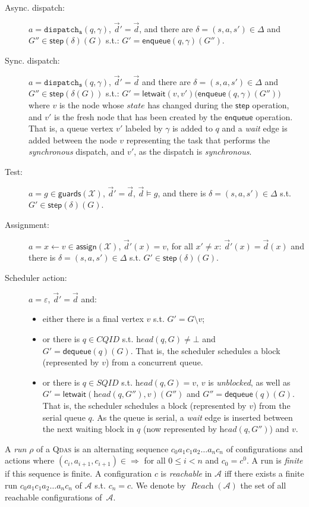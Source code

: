\documentclass[runningheads,oribibl,]{article}
\newcommand{\Aa}{\ensuremath{\mathcal{A}}\xspace}
\newcommand{\Xx}{\ensuremath{\mathcal{X}}\xspace}
\newcommand{\e}{\ensuremath{\varepsilon}\xspace}
\newcommand{\cfont}[1]{\ensuremath{\mathtt{#1}}\xspace}
\newcommand{\CQID}{CQID\xspace}
\newcommand{\SQID}{SQID\xspace}
\newcommand{\qdas}{\textsc{Qdas}\xspace}
\DeclareMathOperator{\Reach}{\textit{Reach}}
\newcommand{\Graph}{\ensuremath{G}}
\newcommand{\Data}{\ensuremath{\vec{d}}}
\newcommand{\state}{\ensuremath{\textit{state}}}
\newcommand{\head}{\ensuremath{\textit{head}}}
\newcommand{\enqueue}{\ensuremath{\textsf{enqueue}}}
\newcommand{\dequeue}{\ensuremath{\textsf{dequeue}}}
\newcommand{\step}{\ensuremath{\textsf{step}}}
\newcommand{\letwait}{\ensuremath{\textsf{letwait}}}
\newcommand{\disps}{\ensuremath{\cfont{dispatch_s}}}
\newcommand{\dispa}{\ensuremath{\cfont{dispatch_a}}}
\newcommand{\guardson}[1]{\ensuremath{\mathsf{guards}\left(#1\right)}}
\newcommand{\assignon}[1]{\ensuremath{\mathsf{assign}\left(#1\right)}}
\begin{document}
\begin{description}
\item[Async. dispatch:] $a=\dispa(q,\gamma)$, $\Data'=\Data$, and
  there are $\delta=(s,a,s')\in \Delta$ and
  $\Graph''\in\step(\delta)(\Graph)$ s.t.:
  $\Graph'=\enqueue(q,\gamma)(\Graph'')$.
\item[Sync. dispatch:] $a=\disps(q,\gamma)$, $\Data'=\Data$ and there
  are $\delta=(s,a,s')\in \Delta$ and
  $\Graph''\in\step(\delta(\Graph))$
  s.t.: $\Graph'=\letwait(v,v')\big(\enqueue(q,\gamma)(\Graph'')\big)$
  where $v$ is the node whose $\state$ has changed during the $\step$
  operation, and $v'$ is the fresh node that has been created by the
  $\enqueue$ operation. That is, a queue vertex $v'$ labeled by
  $\gamma$ is added to $q$ and a \emph{wait} edge is added between the
  node $v$ representing the task that performs the \emph{synchronous}
  dispatch, and $v'$, as the dispatch is \emph{synchronous}.
\item[Test:] $a=g\in\guardson{\Xx}$, $\Data'=\Data$, $\Data\models g$,
  and there is $\delta=(s,a,s')\in \Delta$ s.t.
  $\Graph'\in\step(\delta)(\Graph)$.
\item[Assignment:] $a=x\gets v\in\assignon{\Xx}$, $\Data'(x)=v$, for
  all $x'\neq x$: $\Data'(x)=\Data(x)$ and there is
  $\delta=(s,a,s')\in \Delta$
  s.t. $\Graph'\in\step(\delta)(\Graph)$.
\item[Scheduler action:] $a=\e$, $\Data'=\Data$ and:
  \begin{itemize}
  \item either there is a final vertex $v$
    s.t. $\Graph'=\Graph\setminus v$;
  \item or there is $q\in\CQID$ s.t. $\head(q,\Graph)\neq\bot$ and
    $\Graph'=\dequeue(q)(\Graph)$. That is, the scheduler schedules a
    block (represented by $v$) from a concurrent queue.
  \item or there is $q\in \SQID$ s.t.  $\head(q,\Graph)=v$, $v$ is
    \emph{unblocked}, as well as $\Graph'=\letwait(\head(q,G''),v)(G'')$ and
    $G''=\dequeue(q)(\Graph)$. That is, the scheduler schedules a
    block (represented by $v$) from the serial queue $q$. As the queue
    is serial, a \emph{wait} edge is inserted between the next waiting
    block in $q$ (now represented by $\head(q,G'')$) and $v$.
  \end{itemize}

 \end{description}


 A \emph{run} $\rho$ of a \qdas is an alternating sequence $c_0
 a_1 c_1 a_2\dots a_n c_n$ of configurations and actions where
 $(c_i,a_{i+1},c_{i+1})\in\Longrightarrow$ for all $0\leq i < n$ and
 $c_0=c^0$. A run is \emph{finite} if this sequence is
 finite.
 A configuration $c$ is \emph{reachable} in $\Aa$ iff there
 exists a finite run $c_0 a_1 c_1 a_2\dots a_n c_n$ of $\Aa$ s.t. $c_n=c$. We
 denote by $\Reach(\Aa)$ the set of all reachable configurations
 of~$\Aa$.
\end{document}

